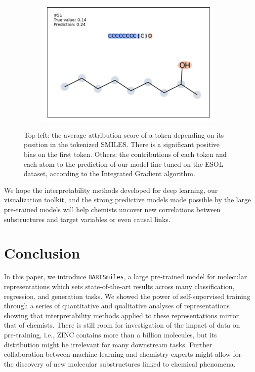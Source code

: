 \documentclass{article} %
\newcommand{\MODEL}{\texttt{BARTSmiles}}
\begin{document}
\begin{figure}[h]
\begin{subfigure}[b]{0.49\textwidth}
    \end{subfigure}\begin{subfigure}[b]{0.49\textwidth}\label{fig:esol51}
      \centering 
      \includegraphics[width=\textwidth]{figures/esol/esol51.pdf} 
    \end{subfigure}
    \caption{Top-left: the average attribution score of a token depending on its position in the tokenized SMILES. There is a significant positive bias on the first token. Others: the contributions of each token and each atom to the prediction of our model fine-tuned on the ESOL dataset, according to the Integrated Gradient algorithm.}
    \label{fig:captum-esol-main}
\end{figure}

We hope the interpretability methods developed for deep learning, our visualization toolkit, and the strong predictive models made possible by the large pre-trained models will help chemists uncover new correlations between substructures and target variables or even causal links.






\section{Conclusion}
In this paper, we introduce \MODEL{}, a large pre-trained model for molecular representations which sets state-of-the-art results across many classification, regression, and generation tasks. We showed the power of self-supervised training through a series of quantitative and qualitative analyses of representations showing that interpretability methods applied to these representations mirror that of chemists. There is still room for investigation of the impact of data on pre-training, i.e., ZINC contains more than a billion molecules, but its distribution might be irrelevant for many downstream tasks. Further collaboration between machine learning and chemistry experts might allow for the discovery of new molecular substructures linked to chemical phenomena.  
\end{document}
